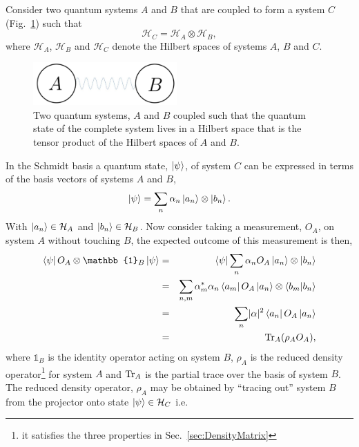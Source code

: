 Consider two quantum systems $A$ and $B$ that are coupled to form a system $C$ (Fig.~\ref{fig:coupledSubsystems}) such that
\begin{equation}
\mathcal{H}_C = \mathcal{H}_A \otimes \mathcal{H}_B,
\label{eqn:coupledSubsystems}
\end{equation}
where $\mathcal{H}_A$, $\mathcal{H}_B$ and $\mathcal{H}_C$  denote the Hilbert spaces of systems $A$, $B$ and $C$. 
\begin{figure}[H]
\begin{center}
\includegraphics[width =0.49\textwidth]{subsystems.pdf}
\caption{Two quantum systems, $A$ and $B$ coupled such that the quantum state of the complete system lives in a Hilbert space that is the tensor product of the Hilbert spaces of $A$ and $B$.}
\label{fig:coupledSubsystems}
\end{center}
\end{figure}

\noindent In the Schmidt basis\cite{Knight1994} a quantum state, $\ket{\psi}$, of system $C$ can be expressed in terms of the basis vectors of systems $A$ and $B$,
\begin{equation}
\ket{\psi} = \sum_{n}\alpha_{n}\ket{a_n}\otimes\ket{b_n}.
\end{equation}
With $\ket{a_n}\in\mathcal{H}_A$ and $\ket{b_n}\in\mathcal{H}_B$. Now consider taking a measurement, $O_A$, on system $A$ without touching $B$, the expected outcome of this measurement is then,
\begin{eqnarray}
\bra{\psi}O_A \otimes \mathbb{1}_B\ket{\psi} &=& \bra{\psi} \sum_{n}\alpha_n O_A\ket{a_n}\otimes\ket{b_n} \\ &=& \sum_{n,m}\alpha_m^*\alpha_n\bra{a_m} O_A \ket{a_n}\otimes\langle b_m | b_n\rangle
\\ &=& \sum_n \lvert\alpha\rvert^2\bra{a_n} O_A \ket{a_n} \\
&=& \textnormal{Tr}_A(\rho_A O_A),
\end{eqnarray}
where $\mathbb{1}_B$ is the identity operator acting on system $B$, $\rho_A$ is the reduced density operator\footnote{it satisfies the three properties in Sec.~\ref{sec:DensityMatrix}} for system $A$ and $\textnormal{Tr}_A$ is the partial trace over the basis of system $B$. The reduced density operator, $\rho_A$ may be obtained by ``tracing out'' system $B$ from the projector onto state $\ket{\psi}\in\mathcal{H}_C$ i.e.

